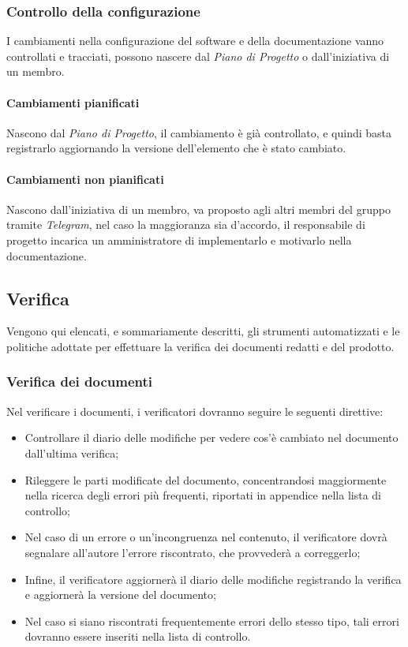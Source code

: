       \subsubsection{Controllo della configurazione}
      I cambiamenti nella configurazione del software e della documentazione vanno controllati e tracciati, possono nascere dal \emph{Piano di Progetto} o dall'iniziativa di un membro.
      \paragraph{Cambiamenti pianificati}
	Nascono dal \emph{Piano di Progetto}, il cambiamento è già controllato, e quindi basta registrarlo aggiornando la versione dell'elemento che è stato cambiato.
	\paragraph{Cambiamenti non pianificati}
	Nascono dall'iniziativa di un membro, va proposto agli altri membri del gruppo tramite \emph{Telegram}, nel caso la maggioranza sia d'accordo, il responsabile di progetto incarica un amministratore di implementarlo e motivarlo nella documentazione.



      
  \subsection{Verifica}
    Vengono qui elencati, e sommariamente descritti, gli strumenti automatizzati e le politiche adottate per effettuare la verifica dei documenti redatti e del  prodotto.

\subsubsection{Verifica dei documenti}
Nel verificare i documenti, i verificatori dovranno seguire le seguenti direttive:
\begin{itemize}
\item Controllare il diario delle modifiche per vedere cos'è cambiato nel documento
dall'ultima verifica;
\item Rileggere le parti modificate del documento, concentrandosi maggiormente nella
ricerca degli errori più frequenti, riportati in appendice nella lista di controllo;
\item Nel caso di un errore o un'incongruenza nel contenuto, il verificatore dovrà segnalare all'autore l'errore riscontrato, che provvederà a correggerlo;
\item Infine, il verificatore aggiornerà il diario delle modifiche registrando la verifica e
aggiornerà la versione del documento;
\item Nel caso si siano riscontrati frequentemente errori dello stesso tipo, tali errori
dovranno essere inseriti nella lista di controllo.

\end{itemize}

